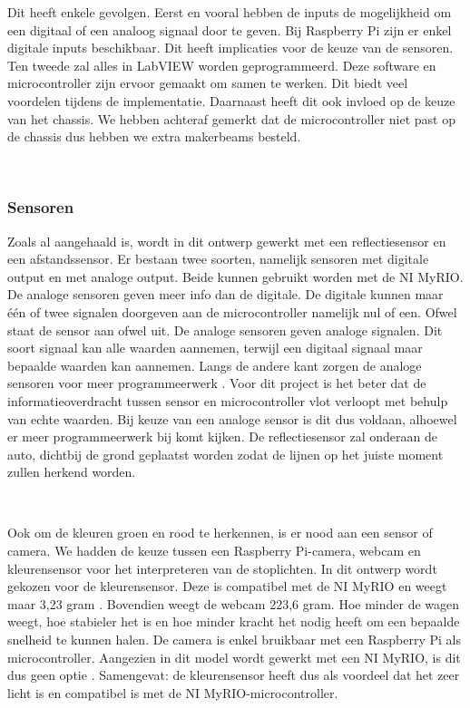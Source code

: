 \documentclass[a4paper,twoside,kulak]{kulakreport} %
\begin{document}
Dit heeft enkele gevolgen.
Eerst en vooral hebben de inputs de mogelijkheid om een digitaal of een analoog signaal door te geven. Bij Raspberry Pi zijn er enkel digitale inputs beschikbaar. Dit heeft implicaties voor de keuze van de sensoren. Ten tweede zal alles in LabVIEW worden geprogrammeerd. Deze software en microcontroller zijn ervoor gemaakt om samen te werken. Dit biedt veel voordelen tijdens de implementatie. Daarnaast heeft dit ook invloed op de keuze van het chassis. We hebben achteraf gemerkt dat de microcontroller niet past op de chassis dus hebben we extra makerbeams besteld.

\label{Microcontroller}
~
\subsubsection{Sensoren}
Zoals al aangehaald is, wordt in dit ontwerp gewerkt met een reflectiesensor en een afstandssensor. Er bestaan twee soorten, namelijk sensoren met digitale output en met analoge output. Beide kunnen gebruikt worden met de NI MyRIO. De analoge sensoren geven meer info dan de digitale. De digitale kunnen maar één of twee signalen doorgeven aan de microcontroller namelijk nul of een. Ofwel staat de sensor aan ofwel uit. De analoge sensoren geven analoge signalen. Dit soort signaal kan alle waarden aannemen, terwijl een digitaal signaal maar bepaalde waarden kan aannemen. Langs de andere kant zorgen de analoge sensoren voor meer programmeerwerk \cite{DigitaalOfAnaloog}. Voor dit project is het beter dat de informatieoverdracht tussen sensor en microcontroller vlot verloopt met behulp van echte waarden. Bij keuze van een analoge sensor is dit dus voldaan, alhoewel er meer programmeerwerk bij komt kijken. %
De reflectiesensor zal onderaan de auto, dichtbij de grond geplaatst worden zodat de lijnen op het juiste moment zullen herkend worden.

~

Ook om de kleuren groen en rood te herkennen, is er nood aan een sensor of camera. We hadden de keuze tussen een Raspberry Pi-camera, webcam en kleurensensor voor het interpreteren van de stoplichten. In dit ontwerp wordt gekozen voor de kleurensensor. Deze is compatibel met de NI MyRIO en weegt maar 3,23 gram \cite{Webcam,TCS34725KleurSensorBOB}. Bovendien weegt de webcam 223,6 gram. Hoe minder de wagen weegt, hoe stabieler het is en hoe minder kracht het nodig heeft om een bepaalde snelheid te kunnen halen. De camera is enkel bruikbaar met een Raspberry Pi als microcontroller. Aangezien in dit model wordt gewerkt met een NI MyRIO, is dit dus geen optie \cite{RPi-camera}. Samengevat: de kleurensensor heeft dus als voordeel dat het zeer licht is en compatibel is met de NI MyRIO-microcontroller.
\label{Sensoren}
~
\end{document}
